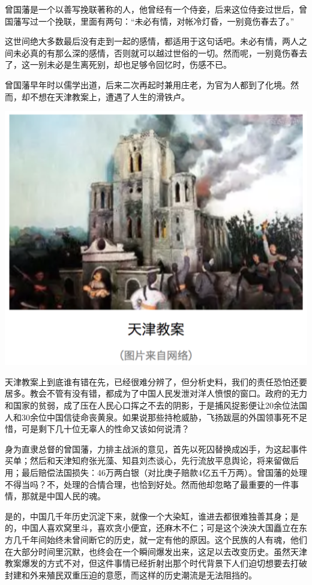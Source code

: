 \documentclass[
]{book}
\begin{document}
曾国藩是一个以善写挽联著称的人，他曾经有一个侍妾，后来这位侍妾过世后，曾国藩写过一个挽联，里面有两句：``未必有情，对帐冷灯昏，一别竟伤春去了。''

这世间绝大多数最后没有走到一起的感情，都适用于这句话吧。未必有情，两人之间未必真的有那么深的感情，否则就可以越过世俗的一切。然而呢，一别竟伤春去了，这一别未必是生离死别，却也足够令回忆时，伤感不已。

曾国藩早年时以儒学出道，后来二次再起时兼用庄老，为官为人都到了化境。然而，却不想在天津教案上，遭遇了人生的滑铁卢。

\includegraphics[width=6.67in]{images/his3}

天津教案上到底谁有错在先，已经很难分辨了，但分析史料，我们的责任恐怕还要居多。教会不管有没有错，都成为了中国人民发泄对洋人愤恨的窗口。政府的无力和国家的贫弱，成了压在人民心口挥之不去的阴影，于是捕风捉影便让20余位法国人和30余位中国信徒命丧黄泉。如果说那些持枪威胁，飞扬跋扈的外国领事死不足惜，可是剩下几十位无辜人的性命又该如何说清？

身为直隶总督的曾国藩，力排主战派的意见，首先以死囚替换成凶手，为这起事件买单；然后和天津知府张光藻、知县刘杰谈心，先行流放平息舆论，将来留做后用；最后赔偿法国损失：46万两白银（对比庚子赔款4亿五千万两）。曾国藩的处理不得当吗？不，处理的合情合理，也恰到好处。然而他却忽略了最重要的一件事情，那就是中国人民的魂。

是的，中国几千年历史沉淀下来，就像一个大染缸，谁进去都很难独善其身；是的，中国人喜欢窝里斗，喜欢贪小便宜，还麻木不仁；可是这个泱泱大国矗立在东方几千年间始终未曾间断它的历史，就一定有他的原因。这个民族的人有魂，他们在大部分时间里沉默，也终会在一个瞬间爆发出来，这足以去改变历史。虽然天津教案爆发的方式不对，但这件事情已经折射出那个时代背景下人们迫切想要去打破封建和外来殖民双重压迫的意愿，而这样的历史潮流是无法阻挡的。
\end{document}

